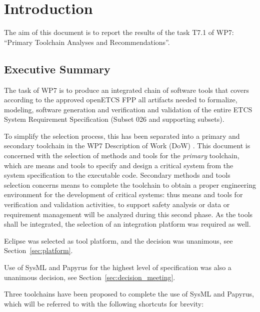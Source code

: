 

\chapter{Introduction}
\label{sec:intro}

The aim of this document is to report the results of the task T7.1 of WP7:  ``Primary Toolchain Analyses and Recommendations''.

\section{Executive Summary}

The task of WP7 is to produce an integrated chain of software tools that covers according to the approved openETCS FPP all artifacts needed to formalize, modeling, software generation and verification and validation of the entire ETCS System Requirement Specification (Subset 026 and supporting subsets).

To simplify the selection process, this has been separated into a primary and secondary toolchain in the WP7 Description of Work (DoW) \citep{WP7_D01}.  This document is concerned with the selection of methods and tools for the \emph{primary} toolchain, which are means and tools to specify and design a critical system from the system specification to the executable code. Secondary methods and tools selection concerns means to complete the toolchain to obtain a proper engineering environment for the development of critical systems: thus means and tools for verification and  validation activities, to support safety analysis or data or requirement management will be analyzed during this second phase.  As the tools shall be integrated, the selection of an integration platform was required as well.

Eclipse was selected as tool platform, and the decision was unanimous, see Section~\ref{sec:platform}.

Use of SysML and Papyrus for the highest level of specification was also a unanimous decision, see Section~\ref{sec:decision_meeting}. 

Three toolchains have been proposed to complete the use of SysML and Papyrus, which will be referred to with the following shortcuts for brevity:

